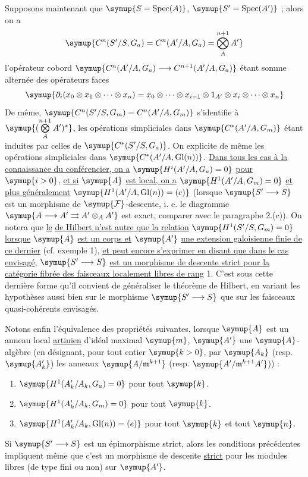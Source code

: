 Supposons maintenant que $\symup{S=\operatorname{Spec}(A)}$,
$\symup{S'=\operatorname{Spec}(A')}$ ; alors on a
\[
  \symup{C^n(S'/S,G_a)=C^n(A'/A,G_a)=\bigotimes\limits_A^{n+1}A'}
\]
l'opérateur cobord
$\symup{C^n(A'/A,G_a)\longrightarrow C^{n+1}(A'/A,G_a)}$ étant somme alternée des
opérateurs faces
\[
  \symup{\partial_i(x_0\otimes x_1\otimes\cdots\otimes x_n)
  =x_0\otimes\cdots\otimes x_{i-1}\otimes1_{A'}\otimes
   x_i\otimes\cdots\otimes x_n}
\]
De même, $\symup{C^n(S'/S,G_m)=C^n(A'/A,G_m)}$ s'identifie à $\symup{(\bigotimes\limits_A^{n+1}A')^*}$, les opérations simpliciales dans $\symup{C^*(A'/A,G_m)}$ étant induites par celles de
$\symup{C^*(S'/S,G_a)}$. On explicite de même les opérations simpliciales dans
$\symup{C^*(A'/A,\operatorname{Gl}(n))}$. \uline{Dans tous les cas à la connaissance du conférencier, on a} $\symup{H^i(A'/A,G_a)=0}$ \uline{pour} $\symup{i>0}$, \uline{et si} $\symup{A}$ \uline{est local, on a} $\symup{H^1(A'/A,G_m)=0}$ \uline{et plus généralement} $\symup{H^1(A'/A,\operatorname{Gl}(n))=(e)}$
(lorsque $\symup{S'\longrightarrow S}$ est un morphisme de $\symup{\mathcal F}$-descente, i. e.
le diagramme
$\symup{A\longrightarrow A'\rightrightarrows A'\otimes_AA'}$ est exact, comparer avec
le paragraphe 2.(c)). On notera que \uline{le}  \uline{de Hilbert n'est autre que la relation}
$\symup{H^1(S'/S,G_m)=0}$
\uline{lorsque} $\symup{A}$ \uline{est un corps et} $\symup{A'}$ \uline{une extension galoisienne finie de ce dernier} (cf. exemple 1), \uline{et peut encore s'exprimer en disant que dans le cas envisagé}, $\symup{S'\longrightarrow S}$ \uline{est un morphisme de descente strict pour la catégorie fibrée des faisceaux localement libres de rang} 1. C'est sous cette
dernière forme qu'il convient de généraliser le théorème de Hilbert, en variant
les hypothèses aussi bien sur le morphisme $\symup{S'\longrightarrow S}$ que sur les
faisceaux quasi-cohérents envisagés.

Notons enfin l'équivalence des propriétés suivantes, lorsque $\symup{A}$ est un anneau
local \uline{artinien} d'idéal maximal $\symup{m}$, $\symup{A'}$ une $\symup{A}$-algèbre (en
désignant, pour tout entier $\symup{k>0}$, par $\symup{A_k}$ (resp. $\symup{A'_k}$) les anneaux
$\symup{A/\mathfrak m^{k+1}}$ (resp. $\symup{A'/\mathfrak m^{k+1}A'}$)) :
\begin{enumerate}
\item[\textnormal{(i).}] $\symup{H^1(A'_k/A_k,G_a)=0}$ pour tout $\symup{k}$.
\item[\textnormal{(ii).}] $\symup{H^1(A'_k/A_k,G_m)=0}$ pour tout $\symup{k}$.
\item[\textnormal{(iii).}] $\symup{H^1(A'_k/A_k,\operatorname{Gl}(n))=(e)}$ pour tout $\symup{k}$ et tout
$\symup{n}$.
\end{enumerate}
Si $\symup{S'\longrightarrow S}$ est un épimorphisme strict, alors les conditions
précédentes impliquent même que c'est un morphisme de descente \uline{strict} pour les
modules libres (de type fini ou non) sur $\symup{A'}$.

